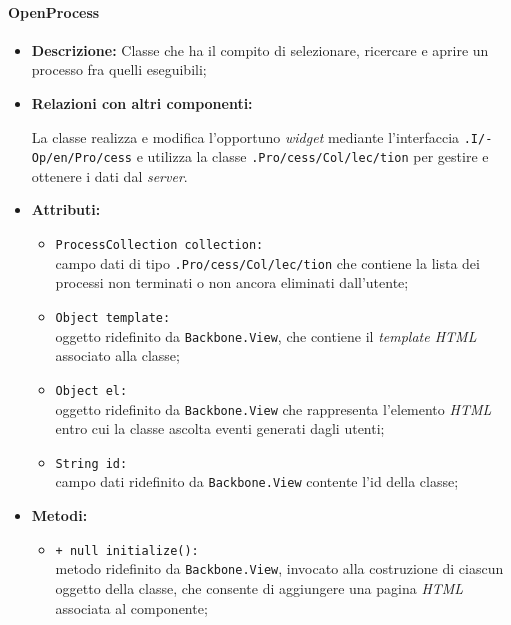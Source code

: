\paragraph{OpenProcess}
\label{openProcessU}
\begin{flushleft}
\begin{itemize}
\item \textbf{Descrizione:} Classe che ha il compito di selezionare, ricercare e aprire un processo fra quelli eseguibili;
\item \textbf{Relazioni con altri componenti:}
\begin{sloppypar}
La classe realizza e modifica l'opportuno \textit{widget} mediante l'interfaccia \texttt{\viewUser{}.I\fshyp{}Op\fshyp{}en\fshyp{}Pro\fshyp{}cess} e utilizza la classe \texttt{\collection{}.Pro\fshyp{}cess\fshyp{}Col\fshyp{}lec\fshyp{}tion} per gestire e ottenere i dati dal \textit{server}.
\end{sloppypar}
\item \textbf{Attributi:}
\begin{sloppypar}
\begin{itemize}
\item \texttt{ProcessCollection collection:}\\ campo dati di tipo \texttt{\collection{}.Pro\fshyp{}cess\fshyp{}Col\fshyp{}lec\fshyp{}tion} che contiene la lista dei processi non terminati o non ancora eliminati dall'utente;
\item \texttt{Object template:}\\ oggetto ridefinito da \texttt{Backbone.View}, che contiene il \textit{template HTML} associato alla classe;
\item \texttt{Object el:}\\ oggetto ridefinito da \texttt{Backbone.View} che rappresenta l'elemento \textit{HTML} entro cui la classe ascolta eventi generati dagli utenti;
\item \texttt{String id:}\\ campo dati ridefinito da \texttt{Backbone.View} contente l'id della classe;
\end{itemize}
\end{sloppypar}
\item \textbf{Metodi:}
\begin{sloppypar}
\begin{itemize}
\item \texttt{+ null initialize():}\\ metodo ridefinito da \texttt{Backbone.View}, invocato alla costruzione di ciascun oggetto della classe, che consente di aggiungere una pagina \textit{HTML} associata al componente;

\end{itemize}
\end{sloppypar}
\end{itemize}
\end{flushleft}
